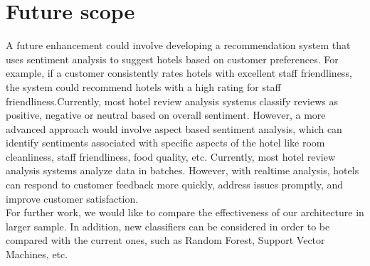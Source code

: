 \documentclass[a4paper, 12pt]{report}
\begin{document}
\section{Future scope}
 A future enhancement could involve developing a recommendation
system that uses sentiment analysis to suggest hotels based on customer preferences. For example, if a
customer consistently rates hotels with excellent staff friendliness, the system could recommend hotels with a
high rating for staff friendliness.Currently, most hotel review analysis systems classify reviews as positive,
negative or neutral based on overall sentiment. However, a more advanced approach would involve aspect based sentiment analysis, which can identify sentiments associated with specific aspects of the hotel like room
cleanliness, staff friendliness, food quality, etc.  Currently, most hotel review analysis systems analyze data in batches. However, with realtime analysis, hotels can respond to customer feedback more quickly, address issues promptly, and improve
customer satisfaction. \\
For further work, we would like to compare the effectiveness of our architecture in larger sample. In addition, new classifiers can be considered in order
to be compared with the current ones, such as Random Forest, Support Vector
Machines, etc.
\end{document}
